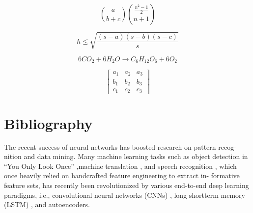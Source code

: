 \documentclass[14pt]{article}
\begin{document}
	$$\binom{a}{b + c} \binom{\frac{n^2-1}{2}}{n+1}$$
	
	$$h\leq \sqrt{\frac{(s-a)(s-b)(s-c)}{s}}$$
	
	$$6CO_2 + 6H_2O \rightarrow C_6H_{12}O_6 + 6O_2$$
	
	\begin{equation}
		\begin{bmatrix}
		a_1 & a_2 & a_3\\
		b_1 & b_2 & b_3\\
		c_1 & c_2 & c_3
		\end{bmatrix}
	\end{equation}
	
	
	
	
	
	
	
	
	\section{Bibliography}
	The recent success of neural networks has boosted research on pattern recog-
	nition and data mining. Many machine learning tasks such as object detection
	in “You Only Look Once” \cite{redmon2016you},machine translation \cite{luong2015effective}, and speech recognition \cite{hinton2012deep}, which once heavily relied on handcrafted feature engineering to extract in-
	formative feature sets, has recently been revolutionized by various end-to-end
	deep learning paradigms, i.e., convolutional neural networks (CNNs) \cite{lecun1995convolutional}, long
	shortterm memory (LSTM) \cite{hochreiter1997long}, and autoencoders.
	
	
	
\end{document}
